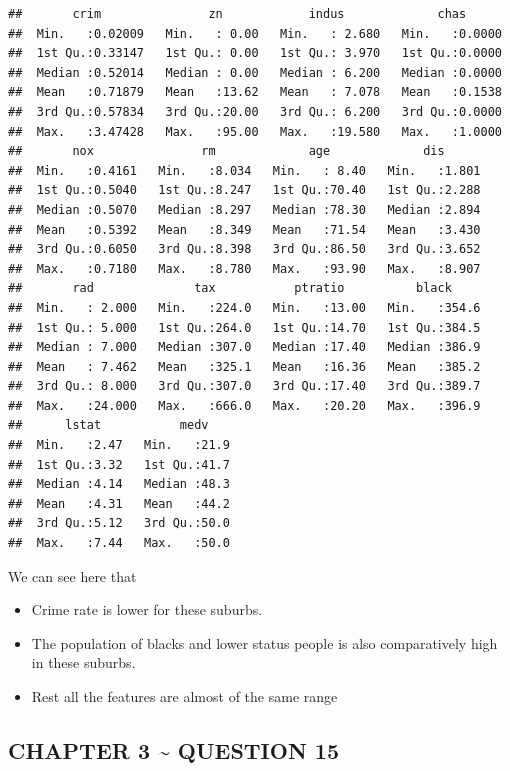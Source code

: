\documentclass[
]{article}
\begin{document}
\begin{verbatim}
##       crim               zn            indus             chas       
##  Min.   :0.02009   Min.   : 0.00   Min.   : 2.680   Min.   :0.0000  
##  1st Qu.:0.33147   1st Qu.: 0.00   1st Qu.: 3.970   1st Qu.:0.0000  
##  Median :0.52014   Median : 0.00   Median : 6.200   Median :0.0000  
##  Mean   :0.71879   Mean   :13.62   Mean   : 7.078   Mean   :0.1538  
##  3rd Qu.:0.57834   3rd Qu.:20.00   3rd Qu.: 6.200   3rd Qu.:0.0000  
##  Max.   :3.47428   Max.   :95.00   Max.   :19.580   Max.   :1.0000  
##       nox               rm             age             dis       
##  Min.   :0.4161   Min.   :8.034   Min.   : 8.40   Min.   :1.801  
##  1st Qu.:0.5040   1st Qu.:8.247   1st Qu.:70.40   1st Qu.:2.288  
##  Median :0.5070   Median :8.297   Median :78.30   Median :2.894  
##  Mean   :0.5392   Mean   :8.349   Mean   :71.54   Mean   :3.430  
##  3rd Qu.:0.6050   3rd Qu.:8.398   3rd Qu.:86.50   3rd Qu.:3.652  
##  Max.   :0.7180   Max.   :8.780   Max.   :93.90   Max.   :8.907  
##       rad              tax           ptratio          black      
##  Min.   : 2.000   Min.   :224.0   Min.   :13.00   Min.   :354.6  
##  1st Qu.: 5.000   1st Qu.:264.0   1st Qu.:14.70   1st Qu.:384.5  
##  Median : 7.000   Median :307.0   Median :17.40   Median :386.9  
##  Mean   : 7.462   Mean   :325.1   Mean   :16.36   Mean   :385.2  
##  3rd Qu.: 8.000   3rd Qu.:307.0   3rd Qu.:17.40   3rd Qu.:389.7  
##  Max.   :24.000   Max.   :666.0   Max.   :20.20   Max.   :396.9  
##      lstat           medv     
##  Min.   :2.47   Min.   :21.9  
##  1st Qu.:3.32   1st Qu.:41.7  
##  Median :4.14   Median :48.3  
##  Mean   :4.31   Mean   :44.2  
##  3rd Qu.:5.12   3rd Qu.:50.0  
##  Max.   :7.44   Max.   :50.0
\end{verbatim}

We can see here that

\begin{itemize}
\item
  Crime rate is lower for these suburbs.
\item
  The population of blacks and lower status people is also comparatively
  high in these suburbs.
\item
  Rest all the features are almost of the same range
\end{itemize}

\pagebreak

\hypertarget{chapter-3-question-15}{%
\subsection{CHAPTER 3 \textasciitilde{} QUESTION
15}\label{chapter-3-question-15}}
\end{document}
